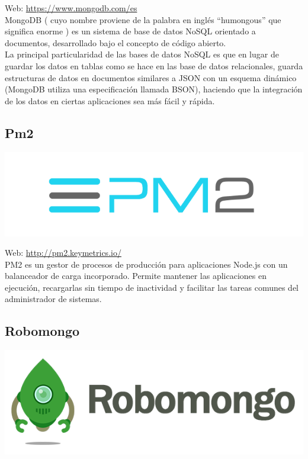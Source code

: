 Web: \url{https://www.mongodb.com/es}\\

MongoDB ( cuyo nombre proviene de la palabra en inglés “humongous” que significa enorme ) es un sistema de base de datos NoSQL orientado a documentos, desarrollado bajo el concepto de código abierto.\\

La principal particularidad de las bases de datos NoSQL es que en lugar de guardar los datos en tablas como se hace en las base de datos relacionales, guarda estructuras de datos en documentos 
similares a JSON con un esquema dinámico (MongoDB utiliza una especificación llamada BSON), haciendo que la integración de los datos en ciertas aplicaciones sea más fácil y rápida.\\

\subsection{Pm2}

\begin{center}
\includegraphics[scale=0.4]{imagenes/pm2-logo.png}
\end{center}

Web: \url{http://pm2.keymetrics.io/}\\


PM2 es un gestor de procesos de producción para aplicaciones Node.js con un balanceador de carga incorporado. Permite mantener las aplicaciones en ejecución, recargarlas sin tiempo de inactividad
y facilitar las tareas comunes del administrador de sistemas.


\subsection{ Robomongo }

\begin{center}
\includegraphics[scale=0.5]{imagenes/robomongo-logo.png}
\end{center}

